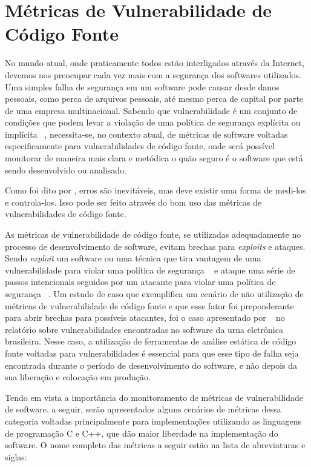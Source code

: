 \section{Métricas de Vulnerabilidade de Código Fonte} \label{cap:metricas_vuln}

No mundo atual, onde praticamente todos estão interligados através da Internet, devemos nos preocupar cada vez mais com a 
segurança dos softwares utilizados. Uma simples falha de segurança em um software pode causar desde danos pessoais, como perca 
de arquivos pessoais, até mesmo perca de capital por parte de uma empresa multinacional. Sabendo que vulnerabilidade é um 
conjunto de condições que podem levar a violação de uma política de segurança explícita ou implícita 
~\cite{seacord&householder2005}, necessita-se, no contexto atual, de métricas de software voltadas especificamente para 
vulnerabilidades de código fonte, onde será possível monitorar de maneira mais clara e metódica o quão seguro é o software que 
está sendo desenvolvido ou analisado.

Como foi dito por , erros são inevitáveis, mas deve
existir uma forma de medi-los e controla-los. Isso pode ser feito através
do bom uso das métricas de vulnerabilidades de código fonte.

As métricas de vulnerabilidade de código fonte, se utilizadas adequadamente no processo de desenvolvimento de software, evitam
brechas para \textit{exploits} e ataques. Sendo \textit{exploit} um software ou uma técnica que tira vantagem de uma 
vulnerabilidade para violar uma política de segurança ~\cite{seacord&householder2005} e ataque uma série de passos intencionais 
seguidos por um atacante para violar uma política de segurança ~\cite{howard&longstaff98}. Um estudo de caso que exemplifica 
um cenário de não utilização de métricas de vulnerabilidade de código fonte e que esse fator foi preponderante para abrir
brechas para possíveis atacantes, foi o caso apresentado por ~ no relatório sobre vulnerabilidades 
encontradas no software da urna eletrônica brasileira. Nesse caso, a utilização de ferramentas de análise estática de código
fonte voltadas para vulnerabilidades é essencial para que esse tipo de falha seja encontrada durante o período de 
desenvolvimento do software, e não depois da sua liberação e colocação em produção.

Tendo em vista a importância do monitoramento de métricas de vulnerabilidade de software, a seguir, serão apresentados alguns
cenários de métricas dessa categoria voltadas principalmente para implementações utilizando as linguagens de programação C e 
C++, que dão maior liberdade na implementação do software. O nome completo das métricas a seguir estão na lista de abreviaturas 
e siglas:

